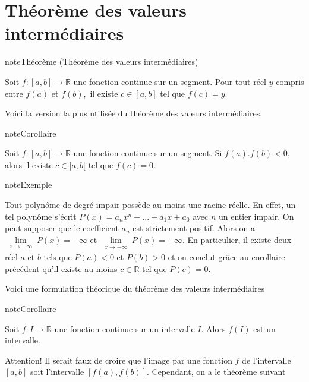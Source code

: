 \documentclass[letterpaper,10pt,french]{jupyterBook}
\begin{document}
\section{Théorème des valeurs intermédiaires}
\label{\detokenize{limitefcts:theoreme-des-valeurs-intermediaires}}
\begin{sphinxadmonition}{note}{Théorème (Théorème des valeurs intermédiaires)}

\sphinxAtStartPar
Soit \(f:[a,b]\rightarrow\mathbb{R}\) une fonction continue sur un segment. Pour tout réel \(y\) compris entre \(f(a)\) et \(f(b),\) il existe \(c\in [a,b]\) tel que \(f(c)=y.\)
\end{sphinxadmonition}

\sphinxAtStartPar
Voici la version la plus utilisée du théorème des valeurs intermédiaires.

\begin{sphinxadmonition}{note}{Corollaire}

\sphinxAtStartPar
Soit \(f:[a,b]\rightarrow\mathbb{R}\) une fonction continue sur un segment. Si \(f(a).f(b)<0,\) alors il existe \(c\in ]a,b[\) tel que \(f(c)=0.\)
\end{sphinxadmonition}

\begin{sphinxadmonition}{note}{Exemple}

\sphinxAtStartPar
Tout polynôme de degré impair possède au moins une racine réelle. En effet, un tel polynôme s’écrit \(P(x)=a_n x^n+...+a_1 x+a_0\) avec \(n\) un entier impair. On peut supposer que le coefficient \(a_n\) est strictement positif. Alors on a \(\lim\limits_{\substack{x\rightarrow-\infty}}P(x)=-\infty\) et \(\lim\limits_{\substack{x\rightarrow+\infty}}P(x)=+\infty.\) En particulier, il existe deux réel \(a\) et \(b\) tels que \(P(a)<0\) et \(P(b)>0\) et on conclut grâce au corollaire précédent qu’il existe au moins \(c\in \mathbb{R}\) tel que \(P(c)=0.\)
\end{sphinxadmonition}

\sphinxAtStartPar
Voici une formulation théorique du théorème des valeurs intermédiaires

\begin{sphinxadmonition}{note}{Corollaire}

\sphinxAtStartPar
Soit \(f:I\rightarrow\mathbb{R}\) une fonction continue sur un intervalle \(I.\) Alors \(f(I)\) est un intervalle.
\end{sphinxadmonition}

\sphinxAtStartPar
Attention! Il serait faux de croire que l’image par une fonction \(f\) de l’intervalle \([a,b]\) soit l’intervalle \([f(a), f(b)]\). Cependant, on a le théorème suivant
\end{document}
